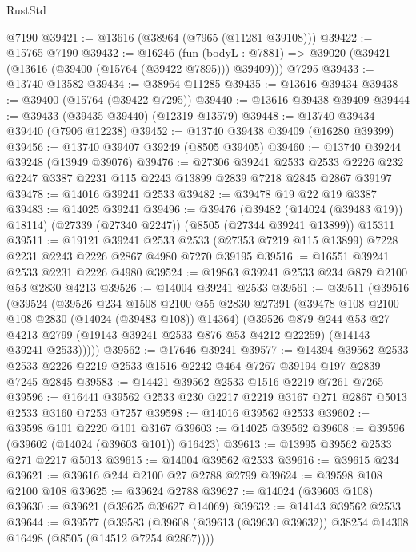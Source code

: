 \begin{lexlean}{RustStd}
\begin{coremodule}
    @7190
@39421 := @13616 (@38964 (@7965 (@11281 @39108)))
@39422 := @15765 @7190
@39432 := @16246
    (fun (bodyL : @7881) => @39020 (@39421 (@13616 (@39400 (@15764 (@39422 @7895))) @39409)))
    @7295
@39433 := @13740 @13582
@39434 := @38964 @11285
@39435 := @13616 @39434
@39438 := @39400 (@15764 (@39422 @7295))
@39440 := @13616 @39438 @39409
@39444 := @39433 (@39435 @39440) (@12319 @13579)
@39448 := @13740 @39434 @39440 (@7906 @12238)
@39452 := @13740 @39438 @39409 (@16280 @39399)
@39456 := @13740 @39407 @39249 (@8505 @39405)
@39460 := @13740 @39244 @39248 (@13949 @39076)
@39476 := @27306
    @39241
    @2533
    @2533
    @2226
    @232
    @2247
    @3387
    @2231
    @115
    @2243
    @13899
    @2839
    @7218
    @2845
    @2867
    @39197
@39478 := @14016 @39241 @2533
@39482 := @39478 @19 @22 @19 @3387
@39483 := @14025 @39241
@39496 := @39476
    (@39482 (@14024 (@39483 @19)) @18114)
    (@27339 (@27340 @2247))
    (@8505 (@27344 @39241 @13899))
    @15311
@39511 := @19121
    @39241
    @2533
    @2533
    (@27353 @7219 @115 @13899)
    @7228
    @2231
    @2243
    @2226
    @2867
    @4980
    @7270
    @39195
@39516 := @16551 @39241 @2533 @2231 @2226 @4980
@39524 := @19863 @39241 @2533 @234 @879 @2100 @53 @2830 @4213
@39526 := @14004 @39241 @2533
@39561 := @39511
    (@39516
      (@39524
        (@39526
          @234
          @1508
          @2100
          @55
          @2830
          @27391
          (@39478 @108 @2100 @108 @2830 (@14024 (@39483 @108)) @14364)
          (@39526
            @879
            @244
            @53
            @27
            @4213
            @2799
            (@19143 @39241 @2533 @876 @53 @4212 @22259)
            (@14143 @39241 @2533)))))
@39562 := @17646 @39241
@39577 := @14394
    @39562
    @2533
    @2533
    @2226
    @2219
    @2533
    @1516
    @2242
    @464
    @7267
    @39194
    @197
    @2839
    @7245
    @2845
@39583 := @14421 @39562 @2533 @1516 @2219 @7261 @7265
@39596 := @16441 @39562 @2533 @230 @2217 @2219 @3167 @271 @2867 @5013 @2533 @3160 @7253 @7257
@39598 := @14016 @39562 @2533
@39602 := @39598 @101 @2220 @101 @3167
@39603 := @14025 @39562
@39608 := @39596 (@39602 (@14024 (@39603 @101)) @16423)
@39613 := @13995 @39562 @2533 @271 @2217 @5013
@39615 := @14004 @39562 @2533
@39616 := @39615 @234
@39621 := @39616 @244 @2100 @27 @2788 @2799
@39624 := @39598 @108 @2100 @108
@39625 := @39624 @2788
@39627 := @14024 (@39603 @108)
@39630 := @39621 (@39625 @39627 @14069)
@39632 := @14143 @39562 @2533
@39644 := @39577
    (@39583 (@39608 (@39613 (@39630 @39632)) @38254 @14308 @16498 (@8505 (@14512 @7254 @2867))))

\end{coremodule}
\end{lexlean}
